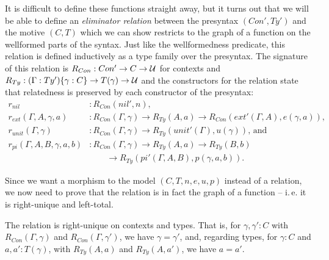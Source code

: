 It is difficult to define these functions straight away, but it turns out that
we will be able to define an \emph{eliminator relation} between the presyntax
$(Con', Ty')$ and the motive $(C, T)$ which we can show restricts to the graph
of a function on the wellformed parts of the syntax.
Just like the wellformedness predicate, this relation is defined inductively
as a type family over the presyntax.
The signature of this relation is $R_{Con} : Con' \to C \to \mathcal{U}$ for contexts
and $R_{Ty} : (\Gamma : Ty') \{\gamma : C\} \to T(\gamma) \to \mathcal{U}$ and the
constructors for the relation state that relatedness is preserved by each
constructor of the presyntax:
\begin{align*}
r_{nil} 
  &: R_{Con}(nil', n) \text{,} \\
r_{ext}(\Gamma, A, \gamma, a) 
  &: R_{Con}(\Gamma, \gamma) \to R_{Ty}(A, a)
    \to R_{Con}(ext'(\Gamma, A), e(\gamma, a)) \text{,}\\
r_{unit}(\Gamma, \gamma)
  &: R_{Con}(\Gamma, \gamma) \to R_{Ty}(unit'(\Gamma), u(\gamma)) \text{, and} \\
r_{pi}(\Gamma, A, B, \gamma, a, b)
  &: R_{Con}(\Gamma, \gamma) \to R_{Ty}(A, a) \to R_{Ty}(B, b) \\
  & \qquad \to R_{Ty}(pi'(\Gamma, A, B), p(\gamma, a, b)) \text{.}
\end{align*}

Since we want a morphism to the model $(C, T, n, e, u, p)$ instead of a relation,
we now need to prove that the relation is in fact the graph of a function --
i.\,e. it is right-unique and left-total.

\begin{lemma}\label{lem:red-ex-right-unique}
The relation is right-unique on contexts and types. That is, for
$\gamma, \gamma' : C$ with $R_{Con}(\Gamma, \gamma)$ and $R_{Con}(\Gamma, \gamma')$,
we have $\gamma = \gamma'$, and, regarding types, for $\gamma : C$ and
$a, a' : T(\gamma)$, with $R_{Ty}(A, a)$ and $R_{Ty}(A, a')$,
we have $a = a'$.
\end{lemma}

